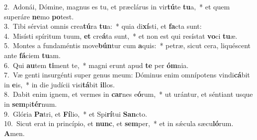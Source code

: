 {2.~}Adonái, Dómine, magnus es tu, et præclárus in vir\textbf{tú}te \textbf{tu}a,~* et quem superáre \textbf{ne}mo \textbf{po}test.\\
{3.~}Tibi sérviat omnis crea\textbf{tú}ra \textbf{tu}a:~* quia di\textbf{xí}sti, et \textbf{fa}cta sunt:\\
{4.~}Misísti spíritum tuum, \textbf{et} cre\textbf{á}ta sunt,~* et non est qui resístat \textbf{vo}ci \textbf{tu}æ.\\
{5.~}Montes a fundaméntis move\textbf{bún}tur cum \textbf{a}quis:~* petræ, sicut cera, liquéscent ante \textbf{fá}ciem \textbf{tu}am.\\
{6.~}Qui \textbf{au}tem \textbf{ti}ment te,~* magni erunt apud \textbf{te} per \textbf{óm}nia.\\
{7.~}Væ genti insurgénti super genus meum: Dóminus enim omnípotens vindi\textbf{cá}bit in \textbf{e}is,~* in die judícii visi\textbf{tá}bit \textbf{il}los.\\
{8.~}Dabit enim ignem, et vermes in \textbf{car}nes e\textbf{ó}rum,~* ut urántur, et séntiant usque in \textbf{sem}pi\textbf{tér}num.\\
{9.~}Glória \textbf{Pa}tri, et \textbf{Fí}lio,~* et Spi\textbf{rí}tui \textbf{San}cto.\\
{10.~}Sicut erat in princípio, et \textbf{nunc}, et \textbf{sem}per,~* et in sǽcula sæcu\textbf{ló}rum. \textbf{A}men.\\
